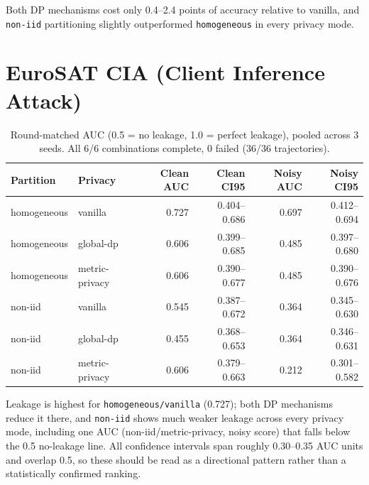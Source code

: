 \documentclass[11pt]{article}
\newcommand{\code}[1]{\texttt{#1}}
\begin{document}
\noindent
Both DP mechanisms cost only 0.4--2.4 points of accuracy relative to vanilla, and \code{non-iid}
partitioning slightly outperformed \code{homogeneous} in every privacy mode.

\section*{EuroSAT CIA (Client Inference Attack)}

\begin{table}[h!]
\centering
\begin{tabular}{llrrrr}
\toprule
Partition & Privacy & Clean AUC & Clean CI95 & Noisy AUC & Noisy CI95 \\
\midrule
homogeneous & vanilla & 0.727 & 0.404--0.686 & 0.697 & 0.412--0.694 \\
homogeneous & global-dp & 0.606 & 0.399--0.685 & 0.485 & 0.397--0.680 \\
homogeneous & metric-privacy & 0.606 & 0.390--0.677 & 0.485 & 0.390--0.676 \\
non-iid & vanilla & 0.545 & 0.387--0.672 & 0.364 & 0.345--0.630 \\
non-iid & global-dp & 0.455 & 0.368--0.653 & 0.364 & 0.346--0.631 \\
non-iid & metric-privacy & 0.606 & 0.379--0.663 & 0.212 & 0.301--0.582 \\
\bottomrule
\end{tabular}
\caption*{Round-matched AUC (0.5 = no leakage, 1.0 = perfect leakage), pooled across 3 seeds.
All 6/6 combinations complete, 0 failed (36/36 trajectories).}
\end{table}

\noindent
Leakage is highest for \code{homogeneous/vanilla} (0.727); both DP mechanisms reduce it there,
and \code{non-iid} shows much weaker leakage across every privacy mode, including one AUC
(non-iid/metric-privacy, noisy score) that falls below the 0.5 no-leakage line. All confidence
intervals span roughly 0.30--0.35 AUC units and overlap 0.5, so these should be read as a
directional pattern rather than a statistically confirmed ranking.
\end{document}
